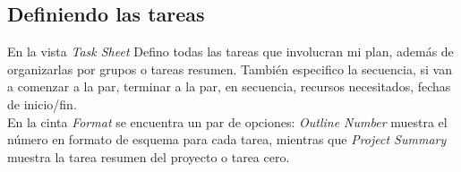 \documentclass[11pt]{article} %
\begin{document}
\subsection{Definiendo las tareas}
En la vista \emph{Task Sheet} Defino todas las tareas que involucran mi plan, además de organizarlas por grupos o tareas resumen. También especifico la secuencia, si van a comenzar a la par, terminar a la par, en secuencia, recursos necesitados, fechas de inicio/fin.\\

En la cinta \emph{Format} se encuentra un par de opciones: \emph{Outline Number} muestra el número en formato de esquema para cada tarea, mientras que \emph{Project Summary} muestra la tarea resumen del proyecto o tarea cero.\\
\end{document}
